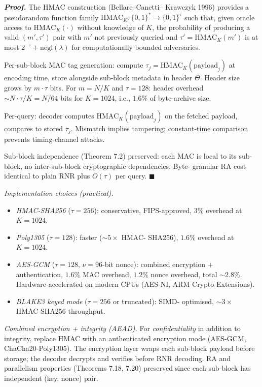 \documentclass[
]{article}
\begin{document}
\emph{\textbf{Proof.}} The HMAC construction (Bellare--Canetti--
Krawczyk 1996) provides a pseudorandom function family $\mathrm{HMAC}_K
: \{0,1\}^* \to \{0,1\}^{\tau}$ such that, given oracle access to
$\mathrm{HMAC}_K(\cdot)$ without knowledge of $K$, the probability of
producing a valid $(m', \tau')$ pair with $m'$ not previously queried
and $\tau' = \mathrm{HMAC}_K(m')$ is at most $2^{-\tau} +
\mathrm{negl}(\lambda)$ for computationally bounded adversaries.

Per-sub-block MAC tag generation: compute $\tau_j = \mathrm{HMAC}_K(
\mathrm{payload}_j)$ at encoding time, store alongside sub-block
metadata in header $\Theta$. Header size grows by $m \cdot \tau$ bits.
For $m = N/K$ and $\tau = 128$: header overhead $\sim N \cdot \tau /
K = N / 64$ bits for $K = 1024$, i.e., $1.6\%$ of byte-archive
size.

Per-query: decoder computes $\mathrm{HMAC}_K(\mathrm{payload}_j)$ on
the fetched payload, compares to stored $\tau_j$. Mismatch implies
tampering; constant-time comparison prevents timing-channel attacks.

Sub-block independence (Theorem 7.2) preserved: each MAC is local to
its sub-block, no inter-sub-block cryptographic dependencies. Byte-
granular RA cost identical to plain RNR plus $O(\tau)$ per query.
\hfill$\blacksquare$

\emph{Implementation choices (practical).}
\begin{itemize}
\item \emph{HMAC-SHA256} ($\tau = 256$): conservative, FIPS-approved,
$3\%$ overhead at $K = 1024$.
\item \emph{Poly1305} ($\tau = 128$): faster ($\sim 5\times$ HMAC-
SHA256), $1.6\%$ overhead at $K = 1024$.
\item \emph{AES-GCM} ($\tau = 128$, $\nu = 96$-bit nonce): combined
encryption + authentication, $1.6\%$ MAC overhead, $1.2\%$ nonce
overhead, total $\sim 2.8\%$. Hardware-accelerated on modern CPUs
(AES-NI, ARM Crypto Extensions).
\item \emph{BLAKE3 keyed mode} ($\tau = 256$ or truncated): SIMD-
optimised, $\sim 3\times$ HMAC-SHA256 throughput.
\end{itemize}

\emph{Combined encryption + integrity (AEAD).} For
\emph{confidentiality} in addition to integrity, replace HMAC with an
authenticated encryption mode (AES-GCM, ChaCha20-Poly1305). The
encryption layer wraps each sub-block payload before storage; the
decoder decrypts and verifies before RNR decoding. RA and parallelism
properties (Theorems 7.18, 7.20) preserved since each sub-block has
independent (key, nonce) pair.
\end{document}
